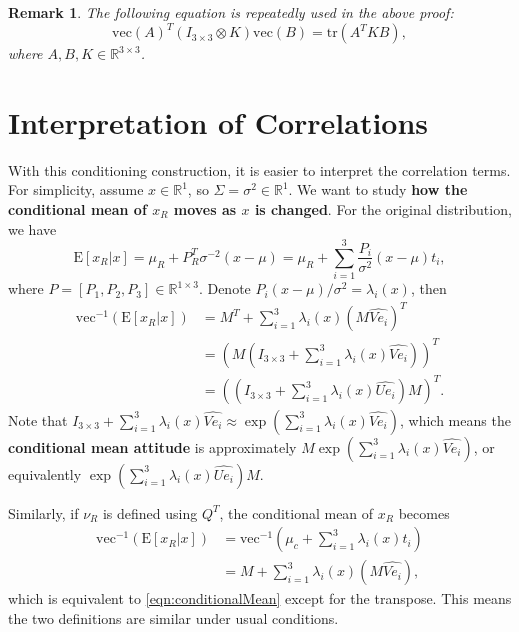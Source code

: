 \documentclass[10pt,twocolumn]{article}
\newtheorem{remark}{Remark}
\newcommand{\tr}[1]{\ensuremath{\mathrm{tr}\left( #1 \right)}}
\newcommand{\expect}[1]{\ensuremath{\mathrm{E}\left[ #1 \right]}}
\newcommand{\real}[1]{\ensuremath{\mathbb{R}^{ #1 }}}
\begin{document}
\begin{remark}
	The following equation is repeatedly used in the above proof:
	\begin{equation}
		\mathrm{vec}(A)^T(I_{3\times 3} \otimes K)\mathrm{vec}(B) = \tr{A^TKB},
	\end{equation}
	where $A,B,K\in\real{3\times 3}$.
\end{remark}

\section{Interpretation of Correlations}

With this conditioning construction, it is easier to interpret the correlation terms.
For simplicity, assume $x\in\real{1}$, so $\Sigma = \sigma^2 \in \real{1}$.
We want to study \textbf{how the conditional mean of $x_R$ moves as $x$ is changed}.
For the original distribution, we have
\begin{equation}
	\expect{x_R \lvert x} = \mu_R + P_R^T \sigma^{-2}(x-\mu) = \mu_R + \sum_{i=1}^3 \frac{P_i}{\sigma^2}(x-\mu)t_i,
\end{equation}
where $P = [P_1, P_2, P_3] \in \real{1\times 3}$.
Denote $P_i(x-\mu)/\sigma^2 = \lambda_i(x)$, then
\begin{align} \label{eqn:conditionalMean}
	\mathrm{vec}^{-1}(\expect{x_R \lvert x}) &= M^T + \sum_{i=1}^3 \lambda_i(x)(M\widehat{Ve_i})^T \nonumber \\
	&= \left( M\left( I_{3\times 3} + \sum_{i=1}^3 \lambda_i(x)\widehat{Ve_i} \right) \right)^T \nonumber \\
	&= \left( \left( I_{3\times 3} + \sum_{i=1}^3\lambda_i(x)\widehat{Ue_i} \right)M \right)^T.
\end{align}
Note that $I_{3\times 3} + \sum_{i=1}^3 \lambda_i(x)\widehat{Ve_i} \approx \exp\left(\sum_{i=1}^3 \lambda_i(x)\widehat{Ve_i}\right)$, which means the \textbf{conditional mean attitude} is approximately $M\exp\left(\sum_{i=1}^3 \lambda_i(x)\widehat{Ve_i}\right)$, or equivalently $\exp\left(\sum_{i=1}^3\lambda_i(x)\widehat{Ue_i}\right)M$.

Similarly, if $\nu_R$ is defined using $Q^T$, the conditional mean of $x_R$ becomes
\begin{align}
	\mathrm{vec}^{-1}(\expect{x_R \lvert x}) &= \mathrm{vec}^{-1}\left(\mu_c + \sum_{i=1}^3\lambda_i(x)t_i\right) \nonumber \\
	&= M + \sum_{i=1}^3 \lambda_i(x)(M\widehat{Ve_i}),
\end{align}
which is equivalent to \eqref{eqn:conditionalMean} except for the transpose.
This means the two definitions are similar under usual conditions.
\end{document}
